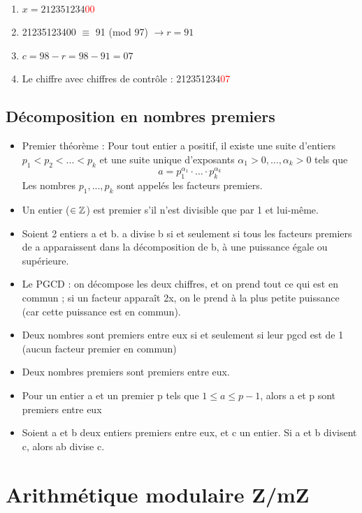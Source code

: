 \documentclass[11pt,a4paper]{article}
\begin{document}
\begin{exemple}[0.55]
	~
	\begin{enumerate}
		\item 	$x = 212351234$\textcolor{red}{00}
		\item 	21235123400 $\equiv$ 91 (mod 97) $\to r = 91$
		\item 	$c = 98-r = 98-91 = 07$
		\item 	Le chiffre avec chiffres de contrôle : 212351234\textcolor{red}{07}
	\end{enumerate}
\end{exemple}
\subsection{Décomposition en nombres premiers}
\begin{itemize}
	\item 	Premier théorème : Pour tout entier a positif, il existe une suite d'entiers $p_1<p_2<...<p_k$ et une suite unique d'exposants $\alpha_1>0,...,\alpha_k>0$ tels que
			\begin{equation*}
				a = p_1^{\alpha_1}\cdot...\cdot p_k^{\alpha_k}
			\end{equation*}
			Les nombres $p_1,...,p_k$ sont appelés les facteurs premiers.
	\item 	Un entier ($\in \mathbb{Z}$) est premier s'il n'est divisible que par 1 et lui-même.
	\item 	Soient 2 entiers a et b. a divise b si et seulement si tous les facteurs premiers de a apparaissent dans la décomposition de b, à une puissance égale ou supérieure.
	\item 	Le PGCD : on décompose les deux chiffres, et on prend tout ce qui est en commun ; si un facteur apparaît 2x, on le prend à la plus petite puissance (car cette puissance est en commun).
	\item 	Deux nombres sont premiers entre eux si et seulement si leur pgcd est de 1 (aucun facteur premier en commun)
	\item 	Deux nombres premiers sont premiers entre eux.
	\item 	Pour un entier a et un premier p tels que $1\leq a \leq p-1$, alors a et p sont premiers entre eux
	\item 	Soient a et b deux entiers premiers entre eux, et c un entier. Si a et b divisent c, alors ab divise c.
\end{itemize}

\section{Arithmétique modulaire Z/mZ}
\end{document}
